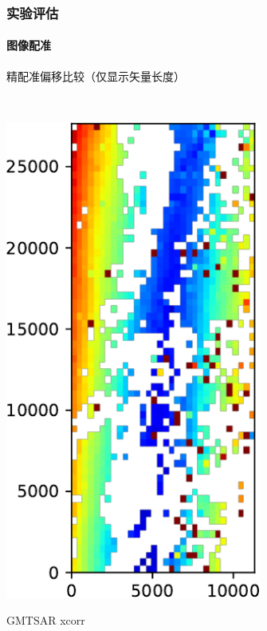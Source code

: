 \documentclass{beamer}
\begin{document}
\begin{frame}
    \frametitle{实验评估}
    \framesubtitle{图像配准}

    精配准偏移比较（仅显示矢量长度） \\~\\
    \begin{columns}
        \begin{column}{0.3\textwidth}
            \centering
            \includegraphics[width=0.8\textwidth]{figures/xcorr-result}\\
            \begin{scriptsize} GMTSAR xcorr \end{scriptsize}
        \end{column}
        \begin{column}{0.3\textwidth}

\end{column}
\end{columns}
\end{frame}
\end{document}
